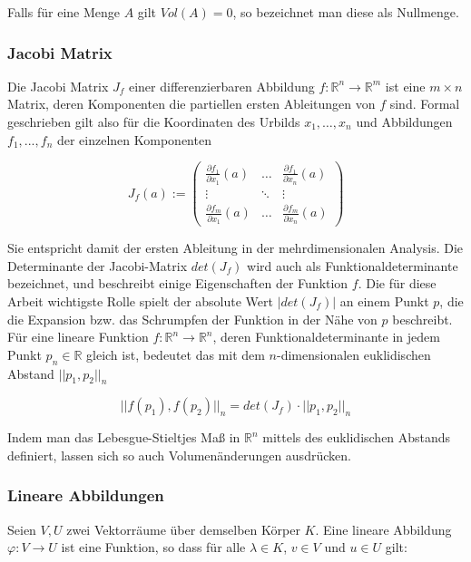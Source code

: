 \documentclass[a4paper,fontsize=12pt,toc=bib,halfparskip]{scrartcl}
\begin{document}
Falls f\"ur eine Menge $A$ gilt $Vol(A)=0$, so bezeichnet man diese als Nullmenge.

\subsubsection{Jacobi Matrix}
Die Jacobi Matrix $J_f$ einer differenzierbaren Abbildung $f: \mathbb{R}^n \rightarrow \mathbb{R}^m$ ist eine $m \times n$ Matrix, deren Komponenten die partiellen ersten Ableitungen von $f$ sind. Formal geschrieben gilt also f\"ur die Koordinaten des Urbilds $x_1, \dots, x_n$ und Abbildungen $f_1, ..., f_n$ der einzelnen Komponenten

\begin{equation}
	J_f(a) := 
	\begin{pmatrix}
		\frac{\partial f_1}{\partial x_1}(a) & \dots & \frac{\partial f_1}{\partial x_n}(a)  \\
		\vdots & \ddots & \vdots \\
		\frac{\partial f_m}{\partial x_1}(a) & \dots & \frac{\partial f_m}{\partial x_n}(a) 
	\end{pmatrix}
\end{equation}

Sie entspricht damit der ersten Ableitung in der mehrdimensionalen Analysis. Die Determinante der Jacobi-Matrix $det(J_f)$ wird auch als Funktionaldeterminante bezeichnet, und beschreibt einige Eigenschaften der Funktion $f$. Die f\"ur diese Arbeit wichtigste Rolle spielt der absolute Wert $|det(J_f)|$ an einem Punkt $p$, die die Expansion bzw. das Schrumpfen der Funktion in der N\"ahe von $p$ beschreibt.  F\"ur eine lineare Funktion $f: \mathbb{R}^n\rightarrow \mathbb{R}^n$, deren Funktionaldeterminante in jedem Punkt $p_n \in \mathbb{R}$ gleich ist, bedeutet das mit dem $n$-dimensionalen euklidischen Abstand $||p_1, p_2||_n$

\begin{equation}
	||f(p_1), f(p_2)||_n = det(J_f)\cdot||p_1, p_2||_n
\end{equation}

Indem man das Lebesgue-Stieltjes Ma{\ss} in $\mathbb{R}^n$ mittels des euklidischen Abstands definiert, lassen sich so auch Volumen\"anderungen ausdr\"ucken.

\subsubsection{Lineare Abbildungen}
Seien $V,U$ zwei Vektorr\"aume \"uber demselben K\"orper $K$. Eine lineare Abbildung $\varphi: V \rightarrow U$ ist eine Funktion, so dass f\"ur alle $\lambda \in K$, $v \in V$ und $u \in U$ gilt\cite[S.~85]{bowen2008introduction}:
\end{document}
